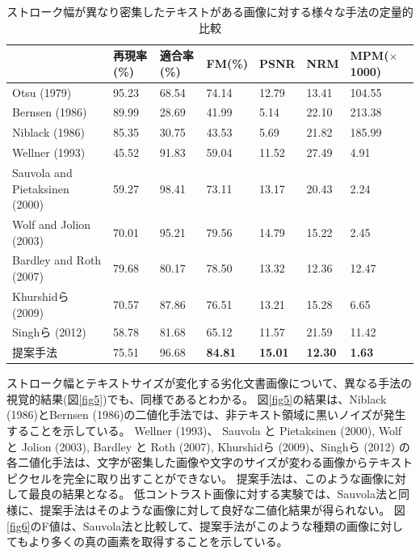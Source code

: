 \documentclass[uplatex, twocolumn,10pt]{jsarticle}
\begin{document}
\begin{table}[tp]
    \centering
    \caption{ストローク幅が異なり密集したテキストがある画像に対する様々な手法の定量的比較}
    \label{table4}
    \begin{tabular}{lllllll}
        \hline
                                       & 再現率(\%) & 適合率(\%) & FM(\%)         & PSNR           & NRM            & MPM($\times$1000) \\
        \hline
        Otsu (1979)                    & 95.23      & 68.54      & 74.14          & 12.79          & 13.41          & 104.55            \\
        Bernsen (1986)                 & 89.99      & 28.69      & 41.99          & 5.14           & 22.10          & 213.38            \\ 
        Niblack (1986)                 & 85.35      & 30.75      & 43.53          & 5.69           & 21.82          & 185.99            \\
        Wellner (1993)                 & 45.52      & 91.83      & 59.04          & 11.52          & 27.49          & 4.91              \\
        Sauvola and Pietaksinen (2000) & 59.27      & 98.41      & 73.11          & 13.17          & 20.43          & 2.24              \\
        Wolf and Jolion (2003)         & 70.01      & 95.21      & 79.56          & 14.79          & 15.22          & 2.45              \\
        Bardley and Roth (2007)        & 79.68      & 80.17      & 78.50          & 13.32          & 12.36          & 12.47             \\
        Khurshidら (2009)              & 70.57      & 87.86      & 76.51          & 13.21          & 15.28          & 6.65              \\
        Singhら (2012)                 & 58.78      & 81.68      & 65.12          & 11.57          & 21.59          & 11.42             \\
        提案手法                       & 75.51      & 96.68      & \textbf{84.81} & \textbf{15.01} & \textbf{12.30} & \textbf{1.63}     \\
        \hline
    \end{tabular}
\end{table}


ストローク幅とテキストサイズが変化する劣化文書画像について、異なる手法の視覚的結果(図\ref{fig5})でも、同様であるとわかる。
図\ref{fig5}の結果は、Niblack (1986)とBernsen (1986)の二値化手法では、非テキスト領域に黒いノイズが発生することを示している。
Wellner (1993)、 Sauvola と Pietaksinen (2000), Wolf と Jolion (2003), Bardley と Roth (2007), 
Khurshidら (2009)、Singhら (2012) の各二値化手法は、文字が密集した画像や文字のサイズが変わる画像からテキストピクセルを完全に取り出すことができない。
提案手法は、このような画像に対して最良の結果となる。
低コントラスト画像に対する実験では、Sauvola法と同様に、提案手法はそのような画像に対して良好な二値化結果が得られない。
図\ref{fig6}のF値は、Sauvola法と比較して、提案手法がこのような種類の画像に対してもより多くの真の画素を取得することを示している。
\end{document}
